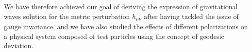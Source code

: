 \documentclass[a4paper]{article}
\begin{document}
We have therefore achieved our goal of deriving the expression of gravitational waves solution for the metric perturbation $h_{\mu\nu}$ after having tackled the issue of gauge invariance, and we have also studied the effects of different polarizations on a physical system composed of test particles using the concept of geodesic deviation.

\nocite{carrol, cas, lus}
\printbibliography
\end{document}
